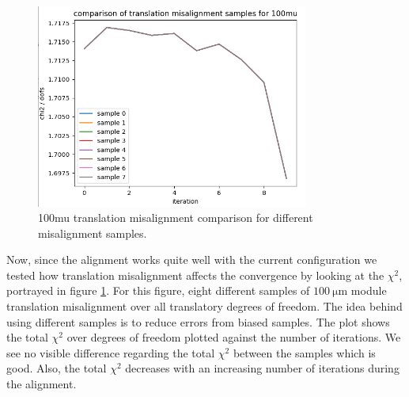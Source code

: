 %

\begin{figure}
  \centering
  \includegraphics[width=0.8\textwidth]{plots/feb_6_2022/100mu_misalignment_samples_compared.png}
  \caption{100mu translation misalignment comparison for different misalignment samples.}
  \label{fig:100muT}
\end{figure}

Now, since the alignment works quite well with the current configuration we
tested how translation misalignment affects the convergence by looking at the
$\chi^2$, portrayed in figure \ref{fig:100muT}. For this figure, eight different samples of $\SI{100}{\micro\metre}$ module translation misalignment over all translatory
degrees of freedom. The idea behind using different samples is to reduce errors
from biased samples. The plot shows the total $\chi^2$ over degrees of freedom
plotted against the number of iterations. We see no visible difference regarding
the total $\chi^2$ between the samples which is good.
Also, the total $\chi^2$ decreases with an increasing number of iterations
during the alignment.

